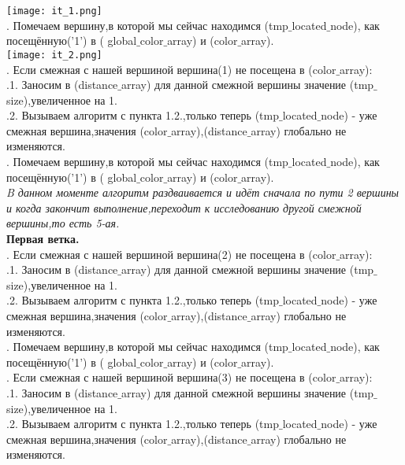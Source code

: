\documentclass[a4paper,11pt]{article}
\begin{document}
\begin{flushleft}
\texttt{[image: it\_1.png]} \\
. Помечаем вершину,в которой мы сейчас находимся (tmp$\_$located$\_$node), как посещённую('1') в ( global$\_$color$\_$array) и (color$\_$array). \\
\texttt{[image: it\_2.png]} \\ 
. Если смежная с нашей вершиной вершина(1) не посещена в (color$\_$array): \\ \quad {}.1. Заносим в (distance$\_$array) для данной смежной вершины значение (tmp$\_$size),увеличенное на 1. \\
\quad {}.2. Вызываем алгоритм с пункта 1.2.,только теперь (tmp$\_$located$\_$node) - уже смежная вершина,значения (color$\_$array),(distance$\_$array) глобально не изменяются. \\
. Помечаем вершину,в которой мы сейчас находимся (tmp$\_$located$\_$node), как посещённую('1') в ( global$\_$color$\_$array) и (color$\_$array). \\
\textit{\quad B данном моменте алгоритм раздваивается и идёт сначала по пути 2 вершины и когда закончит выполнение,переходит к исследованию другой смежной вершины,то есть 5-ая.} \\
\textbf{Первая ветка.} \\
. Если смежная с нашей вершиной вершина(2) не посещена в (color$\_$array): \\
\quad {}.1. Заносим в (distance$\_$array) для данной смежной вершины значение (tmp$\_$size),увеличенное на 1.\\
\quad {}.2. Вызываем алгоритм с пункта 1.2.,только теперь (tmp$\_$located$\_$node) - уже смежная вершина,значения (color$\_$array),(distance$\_$array) глобально не изменяются. \\
. Помечаем вершину,в которой мы сейчас находимся (tmp$\_$located$\_$node), как посещённую('1') в ( global$\_$color$\_$array) и (color$\_$array). \\
. Если смежная с нашей вершиной вершина(3) не посещена в (color$\_$array): \\
\quad {}.1. Заносим в (distance$\_$array) для данной смежной вершины значение (tmp$\_$size),увеличенное на 1.\\
\quad {}.2. Вызываем алгоритм с пункта 1.2.,только теперь (tmp$\_$located$\_$node) - уже смежная вершина,значения (color$\_$array),(distance$\_$array) глобально не изменяются. \\
\end{flushleft}
\end{document}
